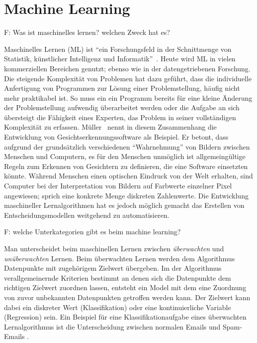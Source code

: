 \chapter{Machine Learning}
\label{ch:machine_learning}
F: Was ist maschinelles lernen? welchen Zweck hat es?

Maschinelles Lernen (ML) ist \enquote{ein Forschungsfeld in der Schnittmenge von Statistik, künstlicher Intelligenz und Informatik}~\cite[S.~1]{Muller.2017}. Heute wird ML in vielen kommerziellen Bereichen genutzt; ebenso wie in der datengetriebenen Forschung. Die steigende Komplexität von Problemen hat dazu geführt, dass die individuelle Anfertigung von Programmen zur Lösung einer Problemstellung, häufig nicht mehr praktikabel ist. So muss ein ein Programm bereits für eine kleine Änderung der Problemstellung aufwendig überarbeitet werden oder die Aufgabe an sich übersteigt die Fähigkeit eines Experten, das Problem in seiner vollständigen Komplexität zu erfassen. Müller~\cite{Muller.2017} nennt in diesem Zusammenhang die Entwicklung von Gesichtserkennungssoftware als Beispiel. Er betont, dass aufgrund der grundsätzlich verschiedenen \enquote{Wahrnehmung} von Bildern zwischen Menschen und Computern, es für den Menschen unmöglich ist allgemeingültige Regeln zum Erkennen von Gesichtern zu definieren, die eine Software einsetzten könnte. Während Menschen einen optischen Eindruck von der Welt erhalten, sind Computer bei der Interpretation von Bildern auf Farbwerte einzelner Pixel angewiesen; sprich eine konkrete Menge diskreten Zahlenwerte. Die Entwicklung maschineller Lernalgorithmen hat es jedoch möglich gemacht das Erstellen von Entscheidungsmodellen weitgehend zu automatisieren.  

F: welche Unterkategorien gibt es beim machine learning?

Man unterscheidet beim maschinellen Lernen zwischen \textit{überwachten} und \textit{unüberwachten} Lernen. Beim überwachten Lernen werden dem Algorithmus Datenpunkte mit zugehörigem Zielwert übergeben. Im der Algorithmus verallgemeinernde Kriterien bestimmt an denen sich die Datenpunkte dem richtigen Zielwert zuordnen lassen, entsteht ein Model mit dem eine Zuordnung von zuvor unbekannten Datenpunkten getroffen werden kann. Der Zielwert kann dabei ein diskreter Wert (Klassifikation) oder eine kontinuierliche Variable (Regression) sein. Ein Beispiel für eine Klassifikationaufgabe eines überwachten Lernalgorithmus ist die Unterscheidung zwischen normalen Emails und Spam-Emails \cite[S.~2]{Muller.2017}.

